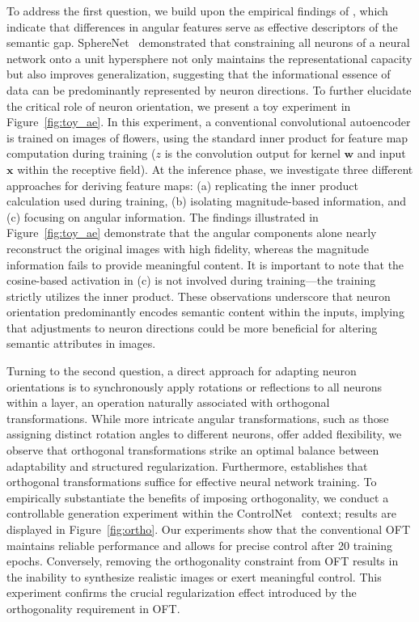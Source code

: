 To address the first question, we build upon the empirical findings of \cite{liu2018decoupled,chen2020angular}, which indicate that differences in angular features serve as effective descriptors of the semantic gap. SphereNet~\cite{liu2017deep} demonstrated that constraining all neurons of a neural network onto a unit hypersphere not only maintains the representational capacity but also improves generalization, suggesting that the informational essence of data can be predominantly represented by neuron directions. To further elucidate the critical role of neuron orientation, we present a toy experiment in Figure~\ref{fig:toy_ae}. In this experiment, a conventional convolutional autoencoder is trained on images of flowers, using the standard inner product for feature map computation during training ($z$ is the convolution output for kernel $\bm{w}$ and input $\bm{x}$ within the receptive field). At the inference phase, we investigate three different approaches for deriving feature maps: (a) replicating the inner product calculation used during training, (b) isolating magnitude-based information, and (c) focusing on angular information. The findings illustrated in Figure~\ref{fig:toy_ae} demonstrate that the angular components alone nearly reconstruct the original images with high fidelity, whereas the magnitude information fails to provide meaningful content. It is important to note that the cosine-based activation in (c) is not involved during training—the training strictly utilizes the inner product. These observations underscore that neuron orientation predominantly encodes semantic content within the inputs, implying that adjustments to neuron directions could be more beneficial for altering semantic attributes in images.

Turning to the second question, a direct approach for adapting neuron orientations is to synchronously apply rotations or reflections to all neurons within a layer, an operation naturally associated with orthogonal transformations. While more intricate angular transformations, such as those assigning distinct rotation angles to different neurons, offer added flexibility, we observe that orthogonal transformations strike an optimal balance between adaptability and structured regularization. Furthermore, \cite{liu2021orthogonal} establishes that orthogonal transformations suffice for effective neural network training. To empirically substantiate the benefits of imposing orthogonality, we conduct a controllable generation experiment within the ControlNet~\cite{zhang2023adding} context; results are displayed in Figure~\ref{fig:ortho}. Our experiments show that the conventional OFT maintains reliable performance and allows for precise control after 20 training epochs. Conversely, removing the orthogonality constraint from OFT results in the inability to synthesize realistic images or exert meaningful control. This experiment confirms the crucial regularization effect introduced by the orthogonality requirement in OFT.


